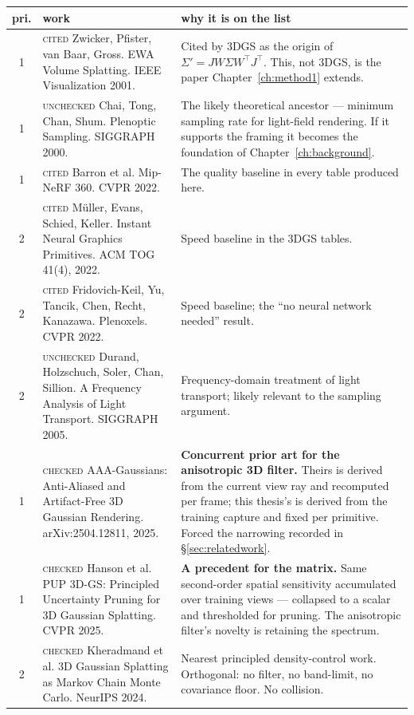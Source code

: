 \begin{table}[htbp]
  \centering
  \small
  \begin{tabularx}{\linewidth}{cL{0.90}L{1.10}}
    \toprule
    pri. & work & why it is on the list \\
     & \textsc{cited} Zwicker, Pfister, van Baar, Gross. EWA Volume Splatting. IEEE Visualization 2001. & Cited by 3DGS as the origin of $\Sigma' = JW\Sigma W^{\!\top}J^{\!\top}$. This, not 3DGS, is the paper Chapter~\ref{ch:method1} extends. \\
    1 & \textsc{unchecked} Chai, Tong, Chan, Shum. Plenoptic Sampling. SIGGRAPH 2000. & The likely theoretical ancestor --- minimum sampling rate for light-field rendering. If it supports the framing it becomes the foundation of Chapter~\ref{ch:background}. \\
    1 & \textsc{cited} Barron et al. Mip-NeRF 360. CVPR 2022. & The quality baseline in every table produced here. \\
    2 & \textsc{cited} M\"uller, Evans, Schied, Keller. Instant Neural Graphics Primitives. ACM TOG 41(4), 2022. & Speed baseline in the 3DGS tables. \\
    2 & \textsc{cited} Fridovich-Keil, Yu, Tancik, Chen, Recht, Kanazawa. Plenoxels. CVPR 2022. & Speed baseline; the ``no neural network needed'' result. \\
    2 & \textsc{unchecked} Durand, Holzschuch, Soler, Chan, Sillion. A Frequency Analysis of Light Transport. SIGGRAPH 2005. & Frequency-domain treatment of light transport; likely relevant to the sampling argument. \\
    1 & \textsc{checked} AAA-Gaussians: Anti-Aliased and Artifact-Free 3D Gaussian Rendering. arXiv:2504.12811, 2025. & \textbf{Concurrent prior art for the anisotropic 3D filter.} Theirs is derived from the current view ray and recomputed per frame; this thesis's is derived from the training capture and fixed per primitive. Forced the narrowing recorded in \S\ref{sec:relatedwork}. \\
    1 & \textsc{checked} Hanson et al. PUP 3D-GS: Principled Uncertainty Pruning for 3D Gaussian Splatting. CVPR 2025. & \textbf{A precedent for the matrix.} Same second-order spatial sensitivity accumulated over training views --- collapsed to a scalar and thresholded for pruning. The anisotropic filter's novelty is retaining the spectrum. \\
    2 & \textsc{checked} Kheradmand et al. 3D Gaussian Splatting as Markov Chain Monte Carlo. NeurIPS 2024. & Nearest principled density-control work. Orthogonal: no filter, no band-limit, no covariance floor. No collision. \\

\end{tabularx}
\end{table}
